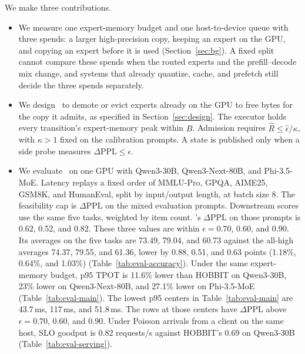 We make three contributions.
\begin{itemize}
  \item We measure one expert-memory budget and one host-to-device queue with three spends: a larger high-precision copy, keeping an expert on the GPU, and copying an expert before it is used (Section~\ref{sec:bg}). A fixed split cannot compare these spends when the routed experts and the prefill--decode mix change, and systems that already quantize, cache, and prefetch still decide the three spends separately.
  \item We design \systemname\ to demote or evict experts already on the GPU to free bytes for the copy it admits, as specified in Section~\ref{sec:design}. The executor holds every transition's expert-memory peak within \(B\). Admission requires \(\widehat R\le\widehat\epsilon/\kappa\), with \(\kappa>1\) fixed on the calibration prompts. A state is published only when a side probe measures \(\Delta\mathrm{PPL}\le\epsilon\).
  \item We evaluate \systemname\ on one GPU with Qwen3-30B, Qwen3-Next-80B, and Phi-3.5-MoE. Latency replays a fixed order of MMLU-Pro, GPQA, AIME25, GSM8K, and HumanEval, split by input/output length, at batch size 8. The feasibility cap is \(\Delta\mathrm{PPL}\) on the mixed evaluation prompts. Downstream scores use the same five tasks, weighted by item count. \systemname's \(\Delta\mathrm{PPL}\) on those prompts is 0.62, 0.52, and 0.82. These three values are within \(\epsilon=0.70\), \(0.60\), and \(0.90\). Its averages on the five tasks are 73.49, 79.04, and 60.73 against the all-high averages 74.37, 79.55, and 61.36, lower by 0.88, 0.51, and 0.63 points (1.18\%, 0.64\%, and 1.03\%) (Table~\ref{tab:eval-accuracy}). Under the same expert-memory budget, p95 TPOT is 11.6\% lower than HOBBIT on Qwen3-30B, 23\% lower on Qwen3-Next-80B, and 27.1\% lower on Phi-3.5-MoE (Table~\ref{tab:eval-main}). The lowest p95 centers in Table~\ref{tab:eval-main} are 43.7\,ms, 117\,ms, and 51.8\,ms. The rows at those centers have \(\Delta\mathrm{PPL}\) above \(\epsilon=0.70\), \(0.60\), and \(0.90\). Under Poisson arrivals from a client on the same host, SLO goodput is 0.82 requests/s against HOBBIT's 0.69 on Qwen3-30B (Table~\ref{tab:eval-serving}).
\end{itemize}

